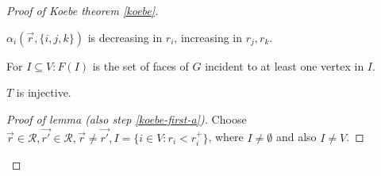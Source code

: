 \begin{proof}[Proof of Koebe theorem \ref{koebe}]
	\begin{observ}
		$\alpha_i(\overrightarrow{r}, \{i,j,k\})$ is decreasing in $r_i$, increasing in $r_j, r_k$.
	\end{observ}

	\begin{notation}
		For $I \subseteq V: F(I)$ is the set of faces of $G$ incident to at least one vertex in $I$.
	\end{notation}

	\begin{lemma}
		$T$ is injective.
	\end{lemma}

	\begin{proof}[Proof of lemma (also step \ref{koebe-first-a})]
		Choose $\overrightarrow{r} \in \mathcal{R}, \overrightarrow{r'} \in \mathcal{R}, \overrightarrow{r} \neq \overrightarrow{r'}, I = \{i \in V : r_i < r_i^+\}$, where $I \neq \emptyset$ and also $I \neq V$.
	\end{proof}
 \end{proof}